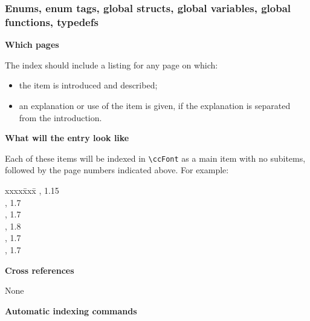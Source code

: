 \documentclass{article}
\newenvironment{indexex}{\begin{tabbing}
xxxx\=xxx\=\kill}{\end{tabbing}}
\begin{document}
\subsubsection{Enums,
            enum tags,
            global structs,
            global variables,
            global functions,
            typedefs}%
%
%
%
%
%
%
\label{enums_etc}

\begin{description}
   \item{\bf Which pages}

         The index should include a listing for any page on which:
           \begin{itemize}
                \item the item is introduced and described;
                \item an explanation or use of the item is given, if the 
                      explanation is separated from the introduction.
           \end{itemize}
   \item{\bf What will the entry look like} 

        Each of these items will be indexed in \verb|\ccFont| as a main 
        item with no subitems, followed by the page numbers indicated above.  
        For example:
        \begin{indexex}
        ,                  1.15 \\
        ,                                 1.7  \\
        ,                                 1.7  \\
        ,                         1.8  \\
        ,                                  1.7  \\
        ,                          1.7
        \end{indexex}

   \item {\bf Cross references} 

         None

   \item {\bf Automatic indexing commands}%


\end{description}
\end{document}
